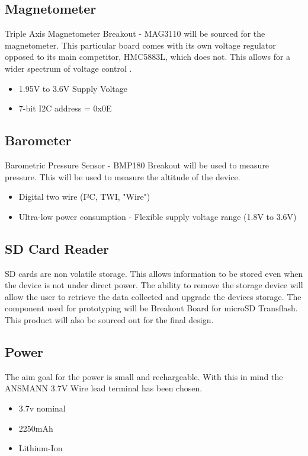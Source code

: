 \documentclass{report}
\begin{document}
\subsection{Magnetometer}
Triple Axis Magnetometer Breakout - MAG3110 will be sourced for the magnetometer. This particular board comes with its own voltage regulator opposed to its main competitor, HMC5883L, which does not. This allows for a wider spectrum of voltage control .
\begin{itemize}
\item 1.95V to 3.6V Supply Voltage
\item 7-bit I2C address = 0x0E
\end{itemize}

\subsection{Barometer}
Barometric Pressure Sensor - BMP180 Breakout will be used to measure pressure. This will be used to measure the altitude of the device. 
\begin{itemize}
\item Digital two wire (I²C, TWI, "Wire")
\item Ultra-low power consumption - Flexible supply voltage range (1.8V to 3.6V)
\end{itemize}

\subsection{SD Card Reader}
SD cards are non volatile storage. This allows information to be stored even when the device is not under direct power. The ability to remove the storage device will allow the user to retrieve the data collected and upgrade the devices storage. The component used for prototyping will be Breakout Board for microSD Transflash. This product will also be sourced out for the final design.


\subsection{Power}
The aim goal for the power is small and rechargeable. With this in mind the ANSMANN 3.7V Wire lead terminal has been chosen.
\begin{itemize}
\item 3.7v nominal
\item 2250mAh
\item Lithium-Ion
\end{itemize}
\end{document}
